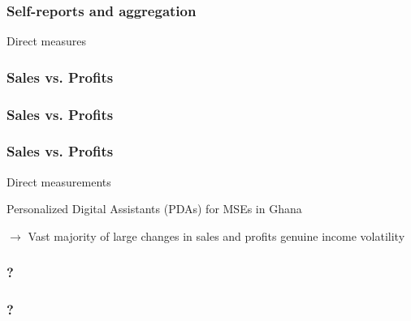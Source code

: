 \documentclass[hideothersubsections, usenames,dvipsnames,11pt]{beamer}
\newenvironment{itemize_2pt}{\itemize\addtolength{\itemsep}{2pt}}{\enditemize}
\begin{document}
\begin{frame}
\frametitle{Self-reports and aggregation}
	\begin{itemize_2pt}
	\item Direct measures \citep{deMel2009}
	\vspace{0.1in}
	\end{itemize_2pt}
\end{frame}


\begin{frame}
\frametitle{Sales vs. Profits}
	\begin{itemize_2pt}
	\item  \citep{deMel2009}
	\vspace{0.1in}
	\end{itemize_2pt}
\end{frame}

\begin{frame}
\frametitle{Sales vs. Profits}
	\begin{itemize_2pt}
	\item \citep{deMel2009}
	\vspace{0.1in}
	\end{itemize_2pt}
\end{frame}

\begin{frame}
\frametitle{Sales vs. Profits}
Direct measurements
	\begin{itemize_2pt}
	\item \citep{Fafchamps2012} Personalized Digital Assistants (PDAs) for MSEs in Ghana
	\item[] $\rightarrow$ Vast majority of large changes in sales and profits genuine income volatility
	\end{itemize_2pt}
\end{frame}


\begin{frame}
\frametitle{?}
\begin{itemize_2pt}
	\item 
	\vspace{0.1in}
\end{itemize_2pt}
\end{frame}

\begin{frame}
\frametitle{?}
\begin{itemize_2pt}
	\item 
	\vspace{0.1in}
\end{itemize_2pt}
\end{frame}
\end{document}
